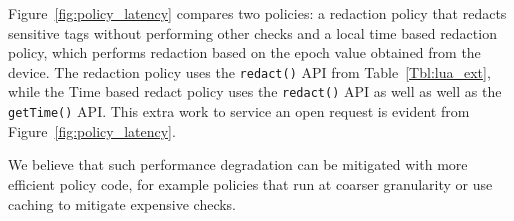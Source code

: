 Figure~\ref{fig:policy_latency} compares two policies: a redaction
policy that redacts sensitive tags without performing other checks and
a local time based redaction policy, which performs redaction based on
the epoch value obtained from the device. The redaction policy uses
the \texttt{redact()} API from Table~\ref{Tbl:lua_ext}, while the Time
based redact policy uses the \texttt{redact()} API as well as well as
the \texttt{getTime()} API. This extra work to service an open request
is evident from Figure~\ref{fig:policy_latency}.

 We believe that such performance degradation can be
mitigated with more efficient policy code, for example policies that
run at coarser granularity or use caching to mitigate expensive
checks.


